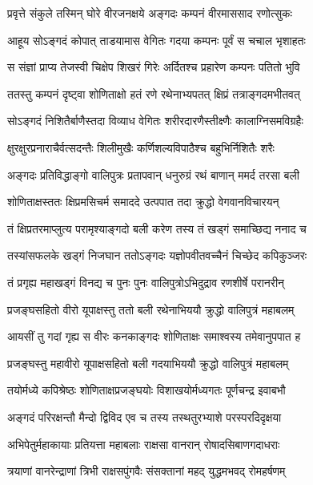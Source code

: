 
\twolineshloka
{प्रवृत्ते संकुले तस्मिन् घोरे वीरजनक्षये}
{अङ्गदः कम्पनं वीरमाससाद रणोत्सुकः} %

\twolineshloka
{आहूय सोऽङ्गदं कोपात् ताडयामास वेगितः}
{गदया कम्पनः पूर्वं स चचाल भृशाहतः} %

\twolineshloka
{स संज्ञां प्राप्य तेजस्वी चिक्षेप शिखरं गिरेः}
{अर्दितश्च प्रहारेण कम्पनः पतितो भुवि} %

\twolineshloka
{ततस्तु कम्पनं दृष्ट्वा शोणिताक्षो हतं रणे}
{रथेनाभ्यपतत् क्षिप्रं तत्राङ्गदमभीतवत्} %

\twolineshloka
{सोऽङ्गदं निशितैर्बाणैस्तदा विव्याध वेगितः}
{शरीरदारणैस्तीक्ष्णैः कालाग्निसमविग्रहैः} %

\twolineshloka
{क्षुरक्षुरप्रनाराचैर्वत्सदन्तैः शिलीमुखैः}
{कर्णिशल्यविपाठैश्च बहुभिर्निशितैः शरैः} %

\twolineshloka
{अङ्गदः प्रतिविद्धाङ्गो वालिपुत्रः प्रतापवान्}
{धनुरुग्रं रथं बाणान् ममर्द तरसा बली} %

\twolineshloka
{शोणिताक्षस्ततः क्षिप्रमसिचर्म समाददे}
{उत्पपात तदा क्रुद्धो वेगवानविचारयन्} %

\twolineshloka
{तं क्षिप्रतरमाप्लुत्य परामृश्याङ्गदो बली}
{करेण तस्य तं खड्गं समाच्छिद्य ननाद च} %

\twolineshloka
{तस्यांसफलके खड्गं निजघान ततोऽङ्गदः}
{यज्ञोपवीतवच्चैनं चिच्छेद कपिकुञ्जरः} %

\twolineshloka
{तं प्रगृह्य महाखड्गं विनद्य च पुनः पुनः}
{वालिपुत्रोऽभिदुद्राव रणशीर्षे परानरीन्} %

\twolineshloka
{प्रजङ्घसहितो वीरो यूपाक्षस्तु ततो बली}
{रथेनाभिययौ क्रुद्धो वालिपुत्रं महाबलम्} %

\twolineshloka
{आयसीं तु गदां गृह्य स वीरः कनकाङ्गदः}
{शोणिताक्षः समाश्वस्य तमेवानुपपात ह} %

\twolineshloka
{प्रजङ्घस्तु महावीरो यूपाक्षसहितो बली}
{गदयाभिययौ क्रुद्धो वालिपुत्रं महाबलम्} %

\twolineshloka
{तयोर्मध्ये कपिश्रेष्ठः शोणिताक्षप्रजङ्घयोः}
{विशाखयोर्मध्यगतः पूर्णचन्द्र इवाबभौ} %

\twolineshloka
{अङ्गदं परिरक्षन्तौ मैन्दो द्विविद एव च}
{तस्य तस्थतुरभ्याशे परस्परदिदृक्षया} %

\twolineshloka
{अभिपेतुर्महाकायाः प्रतियत्ता महाबलाः}
{राक्षसा वानरान् रोषादसिबाणगदाधराः} %

\twolineshloka
{त्रयाणां वानरेन्द्राणां त्रिभी राक्षसपुंगवैः}
{संसक्तानां महद् युद्धमभवद् रोमहर्षणम्} %


